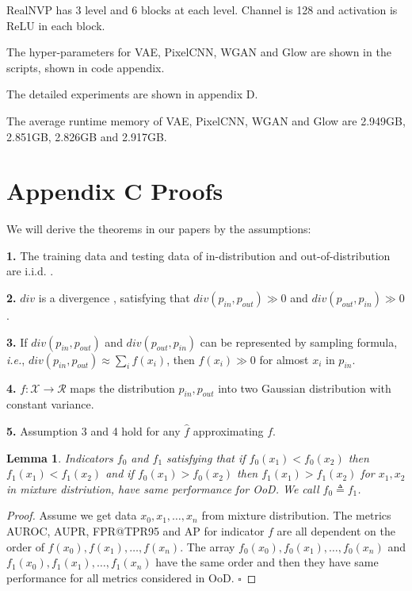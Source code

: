 \documentclass[a3paper]{article}
\newtheorem{lemma}{Lemma}
\newtheorem*{proof}{\it{Proof.}\rm}
\newcommand{\IE}{\textit{i.e.}, }
\newcommand{\pin}{p_{in}}
\newcommand{\pout}{p_{out}}
\newcommand*{\QED}{\hfill\ensuremath{\square}}  %
\begin{document}
RealNVP has 3 level and 6 blocks at each level. Channel is 128 and activation is ReLU in each block. 

The hyper-parameters for VAE, PixelCNN, WGAN and Glow are shown in the scripts, shown in code appendix. 

The detailed experiments are shown in appendix D. 

The average runtime memory of VAE, PixelCNN, WGAN and Glow are 2.949GB, 2.851GB, 2.826GB and 2.917GB. 

\section{Appendix C Proofs}

We will derive the theorems in our papers by the assumptions:

\noindent \textbf{1.} The training data and testing data of in-distribution and out-of-distribution are i.i.d. .

\noindent \textbf{2.}  $div$ is a divergence , satisfying that $div(\pin, \pout) \gg 0$ and $div(\pout, \pin) \gg 0$.

\noindent \textbf{3.}  If $div(\pin, \pout)$ and $div(\pout, \pin)$ can be represented by sampling formula, \IE $div(\pin, \pout) \approx \sum_{i} f(x_i)$, then $f(x_i) \gg 0$ for almost $x_i$ in $\pin$.

\noindent \textbf{4.} $f: \mathcal{X} \rightarrow \mathcal{R}$ maps the distribution $\pin, \pout$ into two Gaussian distribution with constant variance.

\noindent \textbf{5.} Assumption 3 and 4 hold for any $\hat{f}$ approximating $f$.

\begin{lemma}\label{lemma1}
	Indicators $f_0$ and $f_1$ satisfying that if $f_0(x_1) < f_0(x_2)$ then $f_1(x_1) < f_1(x_2)$ and if $f_0(x_1) > f_0(x_2)$ then $f_1(x_1) > f_1(x_2)$ for $x_1, x_2$ in mixture distriution, have same performance for OoD. We call $f_0 \triangleq f_1$. 
\end{lemma}

\begin{proof}\rm
	Assume we get data $x_0, x_1, \ldots, x_n$ from mixture distribution. The metrics AUROC, AUPR, FPR@TPR95 and AP for indicator $f$ are all dependent on the order of $f(x_0), f(x_1), \ldots, f(x_n)$. The array $f_0(x_0), f_0(x_1), \ldots, f_0(x_n)$ and $f_1(x_0), f_1(x_1), \ldots, f_1(x_n)$ have the same order and then they have same performance for all metrics considered in OoD. \QED
\end{proof}
\end{document}
